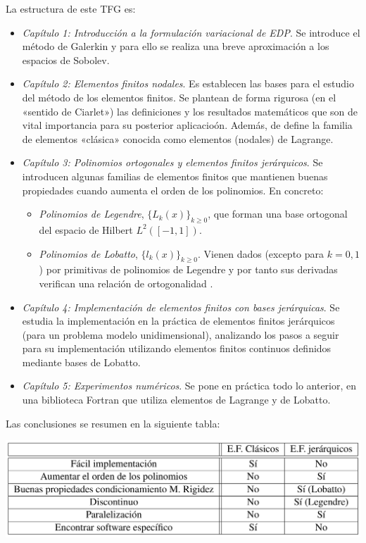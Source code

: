 La estructura de este TFG es:
\begin{itemize}

\item \textit{Capítulo 1: Introducción a la formulación variacional de EDP}.
  Se introduce el método de Galerkin y para ello se realiza una breve
  aproximación a los espacios de Sobolev.
\item \textit{Capítulo 2: Elementos finitos nodales}. Es establecen
  las bases para el estudio del método de los elementos finitos.  Se
  plantean de forma rigurosa (en el «sentido de Ciarlet») las
  definiciones y los resultados matemáticos que son de vital
  importancia para su posterior aplicacioón. Además, de define la
  familia de elementos «clásica» conocida como elementos (nodales) de
  Lagrange.
\item \textit{Capítulo 3: Polinomios ortogonales y elementos finitos
  jerárquicos}.  Se introducen algunas familias de elementos finitos
  que mantienen buenas propiedades cuando aumenta el orden de los
  polinomios. En concreto:
  \begin{itemize}
  \item \textit{Polinomios de Legendre}, $\{L_k(x)\}_{k\ge 0}$, que
    forman una base ortogonal del espacio de Hilbert $L^2([-1,1])$.
  \item \textit{Polinomios de Lobatto}, $\{l_k(x)\}_{k\ge 0}$. Vienen
    dados (excepto para $k=0, 1$) por primitivas de polinomios de
    Legendre y por tanto sus derivadas verifican una relación de
    ortogonalidad .
  \end{itemize}
\item \textit{Capítulo 4: Implementación de elementos finitos con
    bases jerárquicas}. Se estudia la implementación en la práctica
  de elementos finitos jerárquicos (para un problema modelo
  unidimensional), analizando los pasos a seguir para su implementación
   utilizando elementos finitos continuos definidos mediante
  bases de Lobatto.
\item \textit{Capítulo 5: Experimentos numéricos}. Se pone en práctica
  todo lo anterior, en una biblioteca Fortran que utiliza elementos de
  Lagrange y de Lobatto.
 \end{itemize}

 Las conclusiones se resumen en la siguiente tabla:
 \begin{center}
   \includegraphics[width=0.75\linewidth]{img/conclusiones-bases-jerarquicas}
 \end{center}
